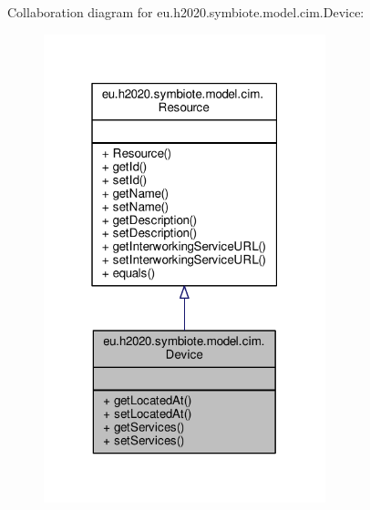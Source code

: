 Collaboration diagram for eu.\+h2020.\+symbiote.\+model.\+cim.\+Device\+:
\nopagebreak
\begin{figure}[H]
\begin{center}
\leavevmode
\includegraphics[width=232pt]{classeu_1_1h2020_1_1symbiote_1_1model_1_1cim_1_1Device__coll__graph}
\end{center}
\end{figure}
